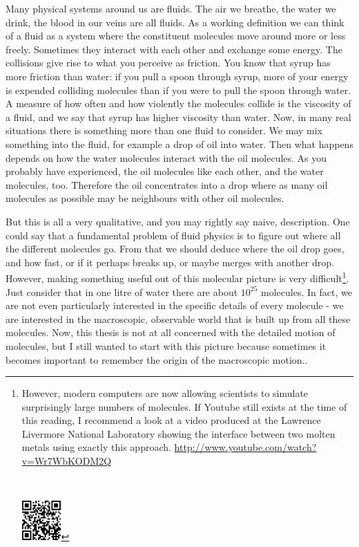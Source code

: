 \documentclass[thesis.tex]{subfiles}
\begin{document}
Many physical systems around us are fluids. The air we breathe, the water we drink, the blood in our veins are all fluids. As a working definition we can think of a fluid as a system where the constituent molecules move around more or less freely. Sometimes they interact with each other and exchange some energy. The collisions give rise to what you perceive as friction. You know that syrup has more friction than water: if you pull a spoon through syrup, more of your energy is expended colliding molecules than if you were to pull the spoon through water. A measure of how often and how violently the molecules collide is the viscosity of a fluid, and we say that syrup has higher viscosity than water. Now, in many real situations there is something more than one fluid to consider. We may mix something into the fluid, for example a drop of oil into water. Then what happens depends on how the water molecules interact with the oil molecules. As you probably have experienced, the oil molecules like each other, and the water molecules, too. Therefore the oil concentrates into a drop where as many oil molecules as possible may be neighbours with other oil molecules.

But this is all a very qualitative, and you may rightly say naive, description. One could say that a fundamental problem of fluid physics is to figure out where all the different molecules go. From that we should deduce where the oil drop goes, and how fast, or if it perhaps breaks up, or maybe merges with another drop. However, making something useful out of this molecular picture is very difficult\footnote{
\begin{minipage}[l]{9cm}
However, modern computers are now allowing scientists to simulate surprisingly large numbers of molecules. If Youtube still exists at the time of this reading, I recommend a look at a video produced at the Lawrence Livermore National Laboratory showing the interface between two molten metals using exactly this approach. \url{http://www.youtube.com/watch?v=Wr7WbKODM2Q}
\end{minipage}\,\,
\begin{minipage}[l]{1.5cm}
\includegraphics[width=1.5cm]{figs/ninebillion_qr.png}
\end{minipage}
}.
Just consider that in one litre of water there are about $10^{25}$ molecules. In fact, we are not even particularly interested in the specific details of every molecule - we are interested in the macroscopic, observable world that is built up from all these molecules. Now, this thesis is not at all concerned with the detailed motion of molecules, but I still wanted to start with this picture because sometimes it becomes important to remember the origin of the macroscopic motion..
\end{document}
